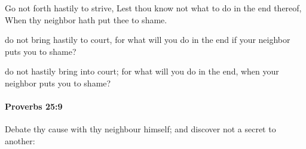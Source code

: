 			\begin{versebox}
					\item[BHS] 
					\item[ASV] Go not forth hastily to strive, Lest thou know not what to do in the end thereof, When thy neighbor hath put thee to shame.
					\item[NIV] do not bring hastily to court, for what will you do in the end if your neighbor puts you to shame?
					\item[NRSV] do not hastily bring into court; for what will you do in the end, when your neighbor puts you to shame?
			\end{versebox}

		\paragraph{Proverbs 25:9} %
			\label{PROVERBS-25-9}

			Debate thy cause with thy neighbour himself; and discover not a secret to another:

